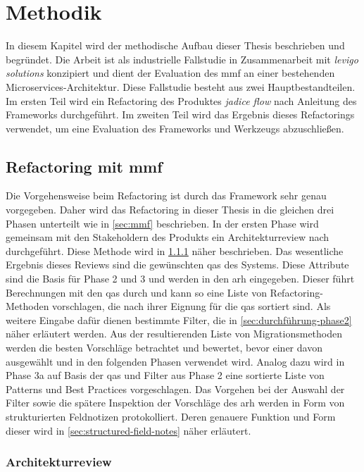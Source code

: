 \chapter{Methodik}
\label{chap:methodik}

In diesem Kapitel wird der methodische Aufbau dieser Thesis beschrieben und begründet.
Die Arbeit ist als industrielle Fallstudie in Zusammenarbeit mit \emph{levigo solutions} konzipiert und dient der Evaluation des \gls{mmf} an einer bestehenden Microservices-Architektur.
Diese Fallstudie besteht aus zwei Hauptbestandteilen.
Im ersten Teil wird ein Refactoring des Produktes \emph{jadice flow} nach Anleitung des Frameworks durchgeführt.
Im zweiten Teil wird das Ergebnis dieses Refactorings verwendet, um eine Evaluation des Frameworks und Werkzeugs abzuschließen.

\section{Refactoring mit \gls{mmf}}

Die Vorgehensweise beim Refactoring ist durch das Framework sehr genau vorgegeben.
Daher wird das Refactoring in dieser Thesis in die gleichen drei Phasen unterteilt wie in \cref{sec:mmf} beschrieben.
In der ersten Phase wird gemeinsam mit den Stakeholdern des Produkts ein Architekturreview nach  durchgeführt.
Diese Methode wird in \cref{sec:methodik-architekturreview} näher beschrieben.
Das wesentliche Ergebnis dieses Reviews sind die gewünschten \glspl{qa} des Systems.
Diese Attribute sind die Basis für Phase 2 und 3 und werden in den \gls{arh} eingegeben.
Dieser führt Berechnungen mit den \glspl{qa} durch und kann so eine Liste von Refactoring-Methoden vorschlagen, die nach ihrer Eignung für die \glspl{qa} sortiert sind.
Als weitere Eingabe dafür dienen bestimmte Filter, die in \cref{sec:durchführung-phase2} näher erläutert werden.
Aus der resultierenden Liste von Migrationsmethoden werden die besten Vorschläge betrachtet und bewertet, bevor einer davon ausgewählt und in den folgenden Phasen verwendet wird.
Analog dazu wird in Phase 3a auf Basis der \glspl{qa} und Filter aus Phase 2 eine sortierte Liste von Patterns und Best Practices vorgeschlagen.
Das Vorgehen bei der Auswahl der Filter sowie die spätere Inspektion der Vorschläge des \gls{arh} werden in Form von strukturierten Feldnotizen protokolliert.
Deren genauere Funktion und Form dieser wird in \cref{sec:structured-field-notes} näher erläutert.

\subsection{Architekturreview}
\label{sec:methodik-architekturreview}

